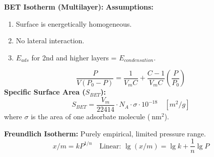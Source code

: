 \textbf{BET Isotherm (Multilayer):}
\textbf{Assumptions:}
\begin{enumerate}
    \item Surface is energetically homogeneous.
    \item No lateral interaction.
    \item $E_{ads}$ for 2nd and higher layers = $E_{condensation}$.
\end{enumerate}
\begin{equation}
    \frac{P}{V(P_0 - P)} = \frac{1}{V_m C} + \frac{C-1}{V_m C} \left( \frac{P}{P_0} \right)
\end{equation}
\textbf{Specific Surface Area ($S_{BET}$):}
\begin{equation}
    S_{BET} = \frac{V_m}{22414} \cdot N_A \cdot \sigma \cdot 10^{-18} \quad [m^2/g]
\end{equation}
where $\sigma$ is the area of one adsorbate molecule ($\SI{}{\nm^2}$).

\textbf{Freundlich Isotherm:}
Purely empirical, limited pressure range.
\begin{equation}
    x/m = k P^{1/n} \quad \text{Linear: } \lg(x/m) = \lg k + \frac{1}{n} \lg P
\end{equation}